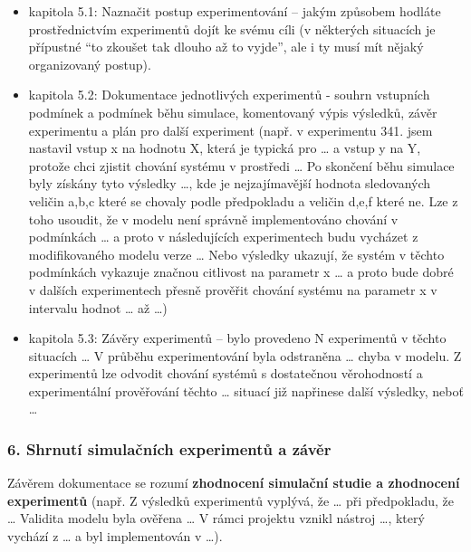 \documentclass{article}
\begin{document}
\begin{itemize}
\tightlist
\item
  kapitola 5.1: Naznačit postup experimentování -- jakým způsobem
  hodláte prostřednictvím experimentů dojít ke svému cíli (v některých
  situacích je přípustné ``to zkoušet tak dlouho až to vyjde'', ale i ty
  musí mít nějaký organizovaný postup).
\item
  kapitola 5.2: Dokumentace jednotlivých experimentů - souhrn vstupních
  podmínek a podmínek běhu simulace, komentovaný výpis výsledků, závěr
  experimentu a plán pro další experiment (např. v experimentu 341. jsem
  nastavil vstup x na hodnotu X, která je typická pro \ldots{} a vstup y
  na Y, protože chci zjistit chování systému v prostředi \ldots{} Po
  skončení běhu simulace byly získány tyto výsledky \ldots{}, kde je
  nejzajímavější hodnota sledovaných veličin a,b,c které se chovaly
  podle předpokladu a veličin d,e,f které ne. Lze z toho usoudit, že v
  modelu není správně implementováno chování v podmínkách \ldots{} a
  proto v následujících experimentech budu vycházet z modifikovaného
  modelu verze \ldots{} Nebo výsledky ukazují, že systém v těchto
  podmínkách vykazuje značnou citlivost na parametr x \ldots{} a proto
  bude dobré v dalších experimentech přesně prověřit chování systému na
  parametr x v intervalu hodnot \ldots{} až \ldots{})
\item
  kapitola 5.3: Závěry experimentů -- bylo provedeno N experimentů v
  těchto situacích \ldots{} V průběhu experimentování byla odstraněna
  \ldots{} chyba v modelu. Z experimentů lze odvodit chování systémů s
  dostatečnou věrohodností a experimentální prověřování těchto \ldots{}
  situací již napřinese další výsledky, neboť \ldots{}
\end{itemize}

\subsubsection{6. Shrnutí simulačních experimentů a
závěr}\label{shrnutuxed-simulaux10dnuxedch-experimentux16f-a-zuxe1vux11br}

Závěrem dokumentace se rozumí \textbf{zhodnocení simulační studie a
zhodnocení experimentů} (např. Z výsledků experimentů vyplývá, že
\ldots{} při předpokladu, že \ldots{} Validita modelu byla ověřena
\ldots{} V rámci projektu vznikl nástroj \ldots{}, který vychází z
\ldots{} a byl implementován v \ldots{}).\\
\end{document}
